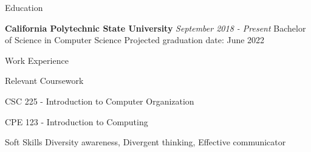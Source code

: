 \documentclass{resume}%
\begin{document}
%
\pagestyle{empty}%
\normalsize%
\begin{flushleft}%
\newcommand{\EducationEntry}[1]{
                            {\bf California Polytechnic State University}
                            \hfill
                            {\em September {#1} - Present}
                        }%
\newcommand{\BoldHeading}[1]{
                            {\bf{#1}}
                        }%
\newcommand{\DatedEntry}[2]{
                            \item{#1} 
                            \hfill
                            {\em{#2}}
                        }%
\newcommand{\FirstDatedEntry}[2]{
                            \text{#1} 
                            \hfill
                            {\em{#2}}
                        }%
\begin{rSection}{Education}%
\EducationEntry{2018}%
\linebreak%
Bachelor of Science in Computer Science%
\linebreak%
Projected graduation date: June 2022%
\end{rSection}%
\begin{rSection}{Work Experience}%
%
\end{rSection}%
\begin{rSection}{Relevant Coursework}%
%
\item{CSC 225 {-} Introduction to Computer Organization}%
\item{CPE 123 {-} Introduction to Computing}%
\end{rSection}%
\begin{rSection}{Soft Skills}%
Diversity awareness, Divergent thinking, Effective communicator%
\end{rSection}%
\end{flushleft}%
\end{document}
